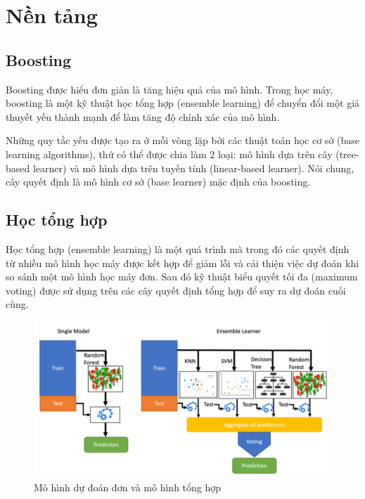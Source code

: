 \documentclass{article}
\begin{document}
\section{Nền tảng}
\subsection{Boosting}
Boosting được hiểu đơn giản là tăng hiệu quả của mô hình. Trong học máy, boosting là một kỹ thuật học tổng hợp (ensemble learning) để chuyển đổi một giả thuyết yếu thành mạnh để làm tăng độ chính xác của mô hình. 

Những quy tắc yếu được tạo ra ở mỗi vòng lặp bởi các thuật toán học cơ sở (base learning algorithms), thứ có thể được chia làm 2 loại: mô hình dựa trên cây (tree-based learner) và mô hình dựa trên tuyến tính (linear-based learner). Nói chung, cây quyết định là mô hình cơ sở (base learner) mặc định của boosting.

\subsection{Học tổng hợp}
Học tổng hợp (ensemble learning) \cite{ensemblelearning} là một quá trình mà trong đó các quyết định từ nhiều mô hình học máy được kết hợp để giảm lỗi và cải thiện việc dự đoán khi so sánh một mô hình học máy đơn. Sau đó kỹ thuật biểu quyết tối đa (maximum voting) được sử dụng trên các cây quyết định tổng hợp để suy ra dự đoán cuối cùng.

\begin{center} 
\begin{figure}[!h]
    \centering
    \includegraphics[scale=0.16]{ensemble-learning.png}
    \caption{Mô hình dự đoán đơn và mô hình tổng hợp \cite{An-xgboost}}
    \label{fig:ensemble-learning}
\end{figure}
\end{center}
\end{document}
